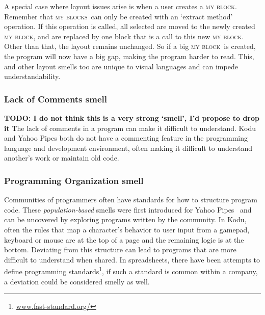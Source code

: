 \documentclass{sig-alternate}
\newcommand{\todo}[1]{\textbf{TODO: #1}}
\newcommand{\mbs}{\textsc{my blocks}}
\newcommand{\mb}{\textsc{my block}}
\begin{document}
A special case where layout issues arise is when a user creates a \mb. Remember that \mbs~can only be created with an `extract method' operation. If this operation is called, all selected are moved to the newly created \mb, and are replaced by one block that is a call to this new \mb. Other than that, the layout remains unchanged. So if a big \mb~is created, the program will now have a big gap, making the program harder to read. This, and other layout smells too are unique to visual languages and can impede understandability. 

%
%	


\subsubsection{Lack of Comments smell} \todo{I do not think this is a very strong `smell', I'd propose to drop it}
The lack of comments in a program can make it difficult to understand. Kodu and Yahoo Pipes both do not have a commenting feature in the programming language and development environment, often making it difficult to understand another's work or maintain old code. 

\subsubsection{Programming Organization smell}
Communities of programmers often have standards for how to structure program code. These \emph{population-based} smells were first introduced for Yahoo Pipes~\cite{StoleeTSE2013} and can be uncovered by exploring programs written by the community. In Kodu, often the rules that map a character's behavior to user input from a gamepad, keyboard or mouse are at the top of a page and the remaining logic is at the bottom. Deviating from this structure can lead to programs that are more difficult to understand when shared. In spreadsheets, there have been attempts to define programming standards\footnote{\url{www.fast-standard.org/}}, if such a standard is common within a company, a deviation could be considered smelly as well.
\end{document}
